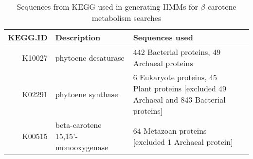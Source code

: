 \begin{table}[hp]
\caption[$\beta$-carotene HMM]{Sequences from KEGG used in generating HMMs for $\beta$-carotene metabolism searches} 
\label{tab:ChClat_KEGGHMM}
\begin{tabular}{rlll}
  \hline
\hline
  KEGG.ID & Description & Sequences used \\ 
  \hline
  K10027 & phytoene desaturase & 442 Bacterial proteins, 49 Archaeal proteins \\ 
  K02291 & phytoene synthase & 6 Eukaryote proteins, 45 Plant proteins [excluded 49 Archaeal and 843 Bacterial proteins] \\ 
  K00515 & beta-carotene 15,15'-monooxygenase & 64 Metazoan proteins [excluded 1 Archaeal protein] \\ 
   \hline
\hline
\end{tabular}
\end{table}
